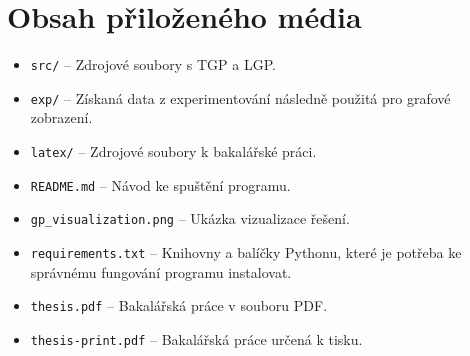 \chapter{Obsah přiloženého média}
\begin{itemize}
    \item \texttt{src/} -- Zdrojové soubory s TGP a LGP.
    \item \texttt{exp/} -- Získaná data z experimentování následně použitá pro grafové zobrazení. 
    \item \texttt{latex/} -- Zdrojové soubory k bakalářské práci.
    \item \texttt{README.md} -- Návod ke spuštění programu.
    \item \texttt{gp\_visualization.png} -- Ukázka vizualizace řešení.
    \item \texttt{requirements.txt} -- Knihovny a balíčky Pythonu, které je potřeba ke správnému fungování programu instalovat.
    \item \texttt{thesis.pdf} -- Bakalářská práce v souboru PDF.
    \item \texttt{thesis-print.pdf} -- Bakalářská práce určená k tisku.
\end{itemize}